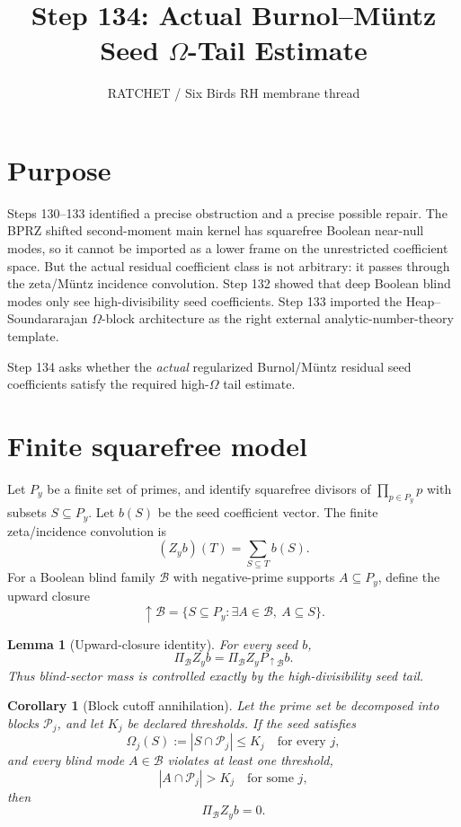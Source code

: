 \documentclass[11pt]{article}
\title{Step 134: Actual Burnol--M\"untz Seed $\Omega$-Tail Estimate}
\author{RATCHET / Six Birds RH membrane thread}
\date{}
\newtheorem{lemma}{Lemma}
\newtheorem{corollary}{Corollary}
\begin{document}
\maketitle

\section{Purpose}
Steps 130--133 identified a precise obstruction and a precise possible repair.  The BPRZ shifted second-moment main kernel has squarefree Boolean near-null modes, so it cannot be imported as a lower frame on the unrestricted coefficient space.  But the actual residual coefficient class is not arbitrary: it passes through the zeta/M\"untz incidence convolution.  Step 132 showed that deep Boolean blind modes only see high-divisibility seed coefficients.  Step 133 imported the Heap--Soundararajan $\Omega$-block architecture as the right external analytic-number-theory template.

Step 134 asks whether the \emph{actual} regularized Burnol/M\"untz residual seed coefficients satisfy the required high-$\Omega$ tail estimate.

\section{Finite squarefree model}
Let $P_y$ be a finite set of primes, and identify squarefree divisors of $\prod_{p\in P_y}p$ with subsets $S\subseteq P_y$.  Let $b(S)$ be the seed coefficient vector.  The finite zeta/incidence convolution is
\[
  (Z_y b)(T)=\sum_{S\subseteq T}b(S).
\]
For a Boolean blind family $\mathcal B$ with negative-prime supports $A\subseteq P_y$, define the upward closure
\[
  \uparrow\mathcal B=\{S\subseteq P_y:\exists A\in\mathcal B,\ A\subseteq S\}.
\]

\begin{lemma}[Upward-closure identity]
For every seed $b$,
\[
  \Pi_{\mathcal B}Z_yb=\Pi_{\mathcal B}Z_yP_{\uparrow\mathcal B}b.
\]
Thus blind-sector mass is controlled exactly by the high-divisibility seed tail.
\end{lemma}

\begin{corollary}[Block cutoff annihilation]
Let the prime set be decomposed into blocks $\mathcal P_j$, and let $K_j$ be declared thresholds.  If the seed satisfies
\[
  \Omega_j(S):=|S\cap\mathcal P_j|\le K_j\quad\text{for every }j,
\]
and every blind mode $A\in\mathcal B$ violates at least one threshold,
\[
  |A\cap\mathcal P_j|>K_j\quad\text{for some }j,
\]
then
\[
  \Pi_{\mathcal B}Z_yb=0.
\]
\end{corollary}
\end{document}
